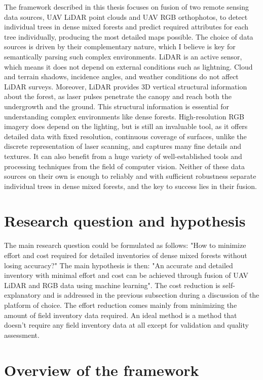 The framework described in this thesis focuses on fusion of two remote sensing data sources, UAV LiDAR point clouds and UAV RGB orthophotos, to detect individual trees in dense mixed forests and predict required attributes for each tree individually, producing the most detailed maps possible.
The choice of data sources is driven by their complementary nature, which I believe is key for semantically parsing such complex environments.
LiDAR is an active sensor, which means it does not depend on external conditions such as lightning.
Cloud and terrain shadows, incidence angles, and weather conditions do not affect LiDAR surveys.
Moreover, LiDAR provides 3D vertical structural information about the forest, as laser pulses penetrate the canopy and reach both the undergrowth and the ground.
This structural information is essential for understanding complex environments like dense forests.
High-resolution RGB imagery does depend on the lighting, but is still an invaluable tool, as it offers detailed data with fixed resolution, continuous coverage of surfaces, unlike the discrete representation of laser scanning, and captures many fine details and textures.
It can also benefit from a huge variety of well-established tools and processing techniques from the field of computer vision.
Neither of these data sources on their own is enough to reliably and with sufficient robustness separate individual trees in dense mixed forests, and the key to success lies in their fusion.

\section{Research question and hypothesis}

The main research question could be formulated as follows: "How to minimize effort and cost required for detailed inventories of dense mixed forests without losing accuracy?"
The main hypothesis is then: "An accurate and detailed inventory with minimal effort and cost can be achieved through fusion of UAV LiDAR and RGB data using machine learning".
The cost reduction is self-explanatory and is addressed in the previous subsection during a discussion of the platform of choice.
The effort reduction comes mainly from minimizing the amount of field inventory data required.
An ideal method is a method that doesn't require any field inventory data at all except for validation and quality assessment.

\section{Overview of the framework}

